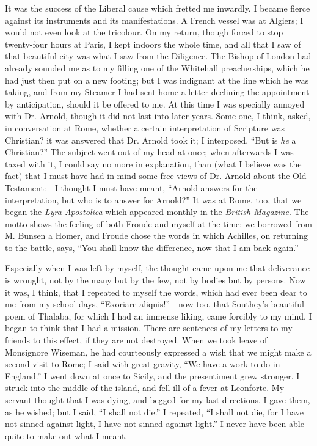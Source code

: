 It was the success of the Liberal cause which fretted me inwardly.
I became fierce against its instruments and its manifestations. A
French vessel was at Algiers; I would not even look at the tricolour.
On my return, though forced to stop twenty-four hours at Paris, I kept indoors the whole time, and all that I saw of
that beautiful city was what I saw from the Diligence. The Bishop of
London had already sounded me as to my filling one of the Whitehall
preacherships, which he had just then put on a new footing; but I was
indignant at the line which he was taking, and from my Steamer I had
sent home a letter declining the appointment by anticipation, should
it be offered to me. At this time I was specially annoyed with Dr.
Arnold, though it did not last into later years. Some one, I think,
asked, in conversation at Rome, whether a certain
interpretation of Scripture was Christian? it was answered that Dr.
Arnold took it; I interposed, ``But is \emph{he} a Christian?''
The subject went out of my head at once; when afterwards I was taxed
with it, I could say no more in explanation, than (what I believe
was the fact) that I must have had in mind some free views of Dr. Arnold about the Old Testament:—I
thought I must have meant, ``Arnold answers for the
interpretation, but who is to answer for Arnold?'' It was at
Rome, too, that we began the \emph{Lyra Apostolica} which appeared monthly in
the \emph{British Magazine}. The motto shows the feeling of both Froude and
myself at the time: we borrowed from M. Bunsen a Homer, and Froude
chose the words in which Achilles, on returning to the battle,
says, ``You shall know the difference, now that I am back
again.''

Especially when I was left by myself, the thought came upon me that
deliverance is wrought, not by the many but by the few, not by bodies
but by persons. Now it was, I think, that I repeated to myself the
words, which had ever been dear to me from my school days, ``Exoriare
aliquis!''—now too, that Southey's beautiful poem of Thalaba,
for which I had an immense liking, came forcibly to my mind. I began
to think that I had a mission. There are sentences of my letters to my
friends to this effect, if they are not destroyed. When we took leave
of Monsignore Wiseman, he had courteously expressed a wish that we
might make a second visit to Rome; I said with great gravity, ``We
have a work to do in England.'' I went down at once to Sicily, and
the presentiment grew stronger. I struck into the middle of the
island, and fell ill of a fever at Leonforte. My servant thought that
I was dying, and begged for my last directions. I gave them, as he
wished; but I said, ``I shall not die.'' I repeated, ``I
shall not die, for I have not sinned against light, I have not sinned
against light.'' I never have been able quite to make out what I
meant.


